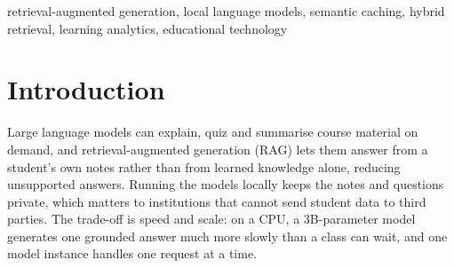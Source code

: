 \documentclass[conference]{IEEEtran}
\newcommand{\sys}{LearnMateAI}
\begin{document}
\begin{abstract}
Study assistants based on local language models keep students' notes and questions on hardware
controlled by the institution, but they are usually designed for one student at a time: generating one
grounded answer can occupy the machine long enough for a class to form a queue, and the system does
not learn from the class as a whole. We demonstrate \sys{}, an open-source self-learning platform in
which all models run locally. A student uploads course notes and receives grounded chat with page
citations, practice questions, key points and summaries, each checked by a second model before use.
Since each document is stored once using its content hash, students who share lecture notes also share
one index and, during revision, often ask similar questions. \sys{} uses this sharing through four
mechanisms: hybrid dense and BM25 retrieval combined inside the vector database; a verified answer
cache that reuses a judge-approved answer only when a cross-encoder confirms that two students asked
the same question; a lease-based job queue feeding a worker pool and continuously batched model
servers; and confusion mining, which groups student questions by pages of the shared notes under a
$k$-anonymity floor. In an end-to-end run, reuse answered a repeated question about two orders of
magnitude faster than generating it again on the same machine, and a worker killed during an answer
had its job recovered by another worker.
\end{abstract}

\begin{IEEEkeywords}
retrieval-augmented generation, local language models, semantic caching, hybrid retrieval,
learning analytics, educational technology
\end{IEEEkeywords}

\section{Introduction}

Large language models can explain, quiz and summarise course material on demand, and retrieval-augmented
generation (RAG) \cite{lewis2020rag} lets them answer from a student's own notes rather than from learned
knowledge alone, reducing unsupported answers. Running the models locally keeps the notes and questions
private, which matters to institutions that cannot send student data to third parties. The trade-off is
speed and scale: on a CPU, a 3B-parameter model generates one grounded answer much more slowly than a
class can wait, and one model instance handles one request at a time.
\end{document}
